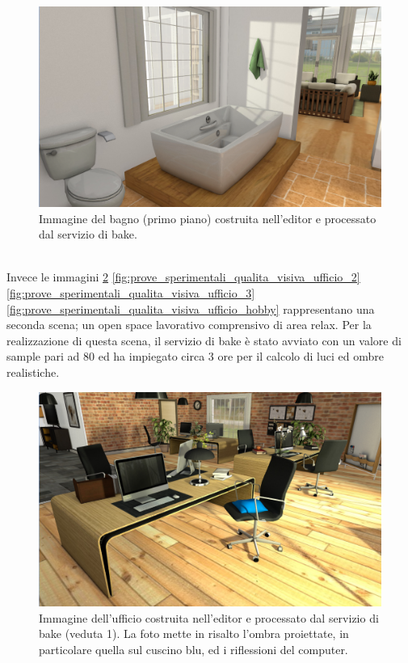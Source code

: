 \begin{figure}[htb]
 \centering
 \includegraphics[width=1\linewidth]{images/chapter_prove_sperimentali/scena_bagno.png}\hfill
 \caption[Ambiente virtuale: Bagno primo piano]{Immagine del bagno (primo piano) costruita nell'editor e processato dal servizio di bake.}
 \label{fig:prove_sperimentali_qualita_visiva_scena_hobby4}
\end{figure}
\\
Invece le immagini \ref{fig:prove_sperimentali_qualita_visiva_ufficio_1} \ref{fig:prove_sperimentali_qualita_visiva_ufficio_2} \ref{fig:prove_sperimentali_qualita_visiva_ufficio_3} \ref{fig:prove_sperimentali_qualita_visiva_ufficio_hobby} rappresentano una seconda scena; un open space lavorativo comprensivo di area relax.
Per la realizzazione di questa scena, il servizio di bake  è stato avviato con un valore di sample pari ad 80 ed ha impiegato circa 3 ore per il calcolo di luci ed ombre realistiche.
\\
\begin{figure}[htb]
 \centering
 \includegraphics[width=0.9\linewidth]{images/chapter_prove_sperimentali/scena_office_vista1.png}\hfill
 \caption[Ambiente virtuale: Ufficio, veduta 1]{Immagine dell'ufficio costruita nell'editor e processato dal servizio di bake (veduta 1). La foto mette in risalto l'ombra proiettate, in particolare quella sul cuscino blu, ed i riflessioni del computer.}
 \label{fig:prove_sperimentali_qualita_visiva_ufficio_1}
\end{figure}

